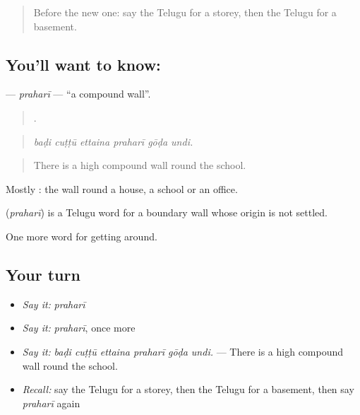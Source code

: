 \label{lesson:TE-C467-prahari}



\begin{quote}
Before the new one: say the Telugu for a storey, then the Telugu for a basement.
\end{quote}

\subsection*{You'll want to know: }
\textbf{} — \emph{praharī} — \textquotedblleft{}a compound wall\textquotedblright{}.

\begin{quote}
     .
\end{quote}

\begin{quote}
\emph{baḍi cuṭṭū ettaina praharī gōḍa undi.}
\end{quote}

\begin{quote}
There is a high compound wall round the school.
\end{quote}

Mostly  : the wall round a house, a school or an office.

\begin{cousinweb}
\textbf{} (\emph{praharī}) is a Telugu word for a boundary wall whose origin is not settled.
\end{cousinweb}

\begin{grammarlens}[title={What you've built}]
One more word for getting around.
\end{grammarlens}

\subsection*{Your turn}
\begin{itemize}
\raggedright
  \item \emph{Say it:} \emph{praharī}
  \item \emph{Say it:} \emph{praharī}, once more
  \item \emph{Say it:} \emph{baḍi cuṭṭū ettaina praharī gōḍa undi.} — There is a high compound wall round the school.
  \item \emph{Recall:} say the Telugu for a storey, then the Telugu for a basement, then say \emph{praharī} again
\end{itemize}

